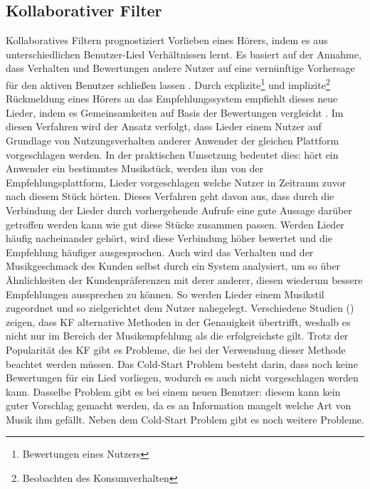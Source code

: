 \documentclass[twosided,a4,10pt]{article}
\begin{document}
\begin{multicols}{2}
		\subsection{Kollaborativer Filter}
		Kollaboratives Filtern prognostiziert Vorlieben eines Hörers, indem es aus unterschiedlichen Benutzer-Lied Verhältnissen lernt. Es basiert auf der Annahme, dass Verhalten und Bewertungen andere Nutzer auf eine vernünftige Vorhersage für den aktiven Benutzer schließen lassen \cite{celma}. Durch explizite\footnote[2]{ Bewertungen eines Nutzers} und implizite\footnote[3]{Beobachten des Konsumverhalten} Rückmeldung eines Hörers an das Empfehlungssystem empfiehlt dieses neue Lieder, indem es Gemeinsamkeiten auf Basis der Bewertungen vergleicht \cite{mcfee}.\newline
		Im diesen Verfahren wird der Ansatz verfolgt, dass Lieder einem Nutzer auf Grundlage von Nutzungsverhalten anderer Anwender der gleichen Plattform vorgeschlagen werden. In der praktischen Umsetzung bedeutet dies: hört ein Anwender ein bestimmtes Musikstück, werden ihm von der Empfehlungsplattform, Lieder vorgeschlagen welche Nutzer in Zeitraum zuvor nach diesem Stück hörten. Dieses Verfahren geht davon aus, dass durch die Verbindung der Lieder durch vorhergehende Aufrufe eine gute Aussage darüber getroffen werden kann wie gut diese Stücke zusammen passen. Werden Lieder häufig nacheinander gehört, wird diese Verbindung höher bewertet und die Empfehlung häufiger ausgesprochen. Auch wird das Verhalten und der Musikgeschmack des Kunden selbst durch ein System analysiert, um so über Ähnlichkeiten der Kundenpräferenzen mit derer anderer, diesen wiederum bessere Empfehlungen aussprechen zu können. So werden Lieder einem Musikstil zugeordnet und so zielgerichtet dem Nutzer nahegelegt.\newline
		Verschiedene Studien (\cite{mcfee}\cite{barrington}) zeigen, dass KF alternative Methoden in der Genauigkeit übertrifft, weshalb es nicht nur im Bereich der Musikempfehlung als die erfolgreichste gilt.\newline
		Trotz der Popularität des KF gibt es Probleme, die bei der Verwendung dieser Methode beachtet werden müssen. Das Cold-Start Problem besteht darin, dass noch keine Bewertungen für ein Lied vorliegen, wodurch es auch nicht vorgeschlagen werden kann. Dasselbe Problem gibt es bei einem neuen Benutzer: diesem kann kein guter Vorschlag gemacht werden, da es an Information mangelt welche Art von Musik ihm gefällt. Neben dem Cold-Start Problem gibt es noch weitere Probleme. \cite{celma} 
		

\end{multicols}
\end{document}
